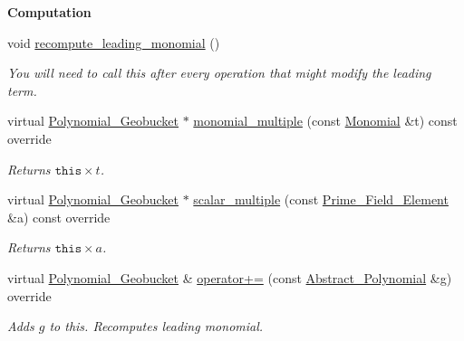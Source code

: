 \begin{Indent}\textbf{ Computation}\par
\begin{DoxyCompactItemize}
\item 
void \hyperlink{group__polygroup_ab57dbe8d5f0d3860997775d9f354ab0c}{recompute\+\_\+leading\+\_\+monomial} ()
\begin{DoxyCompactList}\small\item\em You will need to call this after every operation that might modify the leading term. \end{DoxyCompactList}\item 
\mbox{\label{group__polygroup_a2f474c58fa933e4183b1a165ef3b814d}} 
virtual \hyperlink{group__polygroup_class_polynomial___geobucket}{Polynomial\+\_\+\+Geobucket} $\ast$ \hyperlink{group__polygroup_a2f474c58fa933e4183b1a165ef3b814d}{monomial\+\_\+multiple} (const \hyperlink{group__polygroup_class_monomial}{Monomial} \&t) const override
\begin{DoxyCompactList}\small\item\em Returns $\texttt{this}\times t$. \end{DoxyCompactList}\item 
\mbox{\label{group__polygroup_a0a62c427fc0d8cffce4a875597ab3cc0}} 
virtual \hyperlink{group__polygroup_class_polynomial___geobucket}{Polynomial\+\_\+\+Geobucket} $\ast$ \hyperlink{group__polygroup_a0a62c427fc0d8cffce4a875597ab3cc0}{scalar\+\_\+multiple} (const \hyperlink{group___fields_group_class_prime___field___element}{Prime\+\_\+\+Field\+\_\+\+Element} \&a) const override
\begin{DoxyCompactList}\small\item\em Returns $\texttt{this}\times a$. \end{DoxyCompactList}\item 
\mbox{\label{group__polygroup_a93d4a23dc1e7d76b26bfc1b9d544ed07}} 
virtual \hyperlink{group__polygroup_class_polynomial___geobucket}{Polynomial\+\_\+\+Geobucket} \& \hyperlink{group__polygroup_a93d4a23dc1e7d76b26bfc1b9d544ed07}{operator+=} (const \hyperlink{group__polygroup_class_abstract___polynomial}{Abstract\+\_\+\+Polynomial} \&g) override
\begin{DoxyCompactList}\small\item\em Adds $g$ to {\ttfamily this}. Recomputes leading monomial. \end{DoxyCompactList}\item 

\end{DoxyCompactItemize}
\end{Indent}
